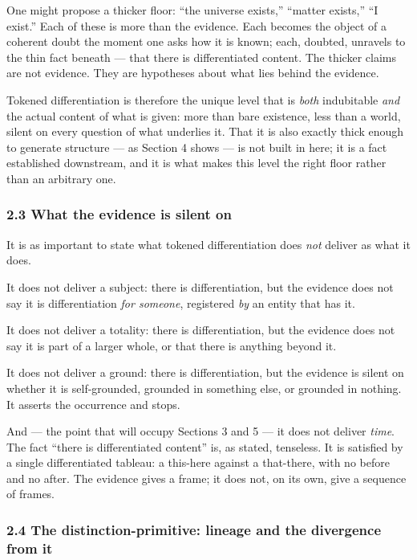 \documentclass[
]{article}
\begin{document}
One might propose a thicker floor: ``the universe exists,'' ``matter
exists,'' ``I exist.'' Each of these is more than the evidence. Each
becomes the object of a coherent doubt the moment one asks how it is
known; each, doubted, unravels to the thin fact beneath --- that there
is differentiated content. The thicker claims are not evidence. They are
hypotheses about what lies behind the evidence.

Tokened differentiation is therefore the unique level that is
\emph{both} indubitable \emph{and} the actual content of what is given:
more than bare existence, less than a world, silent on every question of
what underlies it. That it is also exactly thick enough to generate
structure --- as Section 4 shows --- is not built in here; it is a fact
established downstream, and it is what makes this level the right floor
rather than an arbitrary one.

\hypertarget{what-the-evidence-is-silent-on}{%
\subsubsection{2.3 What the evidence is silent
on}\label{what-the-evidence-is-silent-on}}

It is as important to state what tokened differentiation does \emph{not}
deliver as what it does.

It does not deliver a subject: there is differentiation, but the
evidence does not say it is differentiation \emph{for someone},
registered \emph{by} an entity that has it.

It does not deliver a totality: there is differentiation, but the
evidence does not say it is part of a larger whole, or that there is
anything beyond it.

It does not deliver a ground: there is differentiation, but the evidence
is silent on whether it is self-grounded, grounded in something else, or
grounded in nothing. It asserts the occurrence and stops.

And --- the point that will occupy Sections 3 and 5 --- it does not
deliver \emph{time}. The fact ``there is differentiated content'' is, as
stated, tenseless. It is satisfied by a single differentiated tableau: a
this-here against a that-there, with no before and no after. The
evidence gives a frame; it does not, on its own, give a sequence of
frames.

\hypertarget{the-distinction-primitive-lineage-and-the-divergence-from-it}{%
\subsubsection{2.4 The distinction-primitive: lineage and the divergence
from
it}\label{the-distinction-primitive-lineage-and-the-divergence-from-it}}
\end{document}
